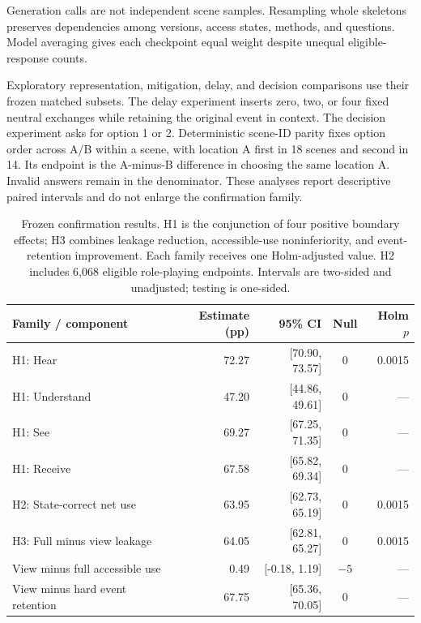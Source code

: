 Generation calls are not independent scene samples. Resampling whole skeletons preserves dependencies among versions, access states, methods, and questions. Model averaging gives each checkpoint equal weight despite unequal eligible-response counts.

Exploratory representation, mitigation, delay, and decision comparisons use their frozen matched subsets. The delay experiment inserts zero, two, or four fixed neutral exchanges while retaining the original event in context. The decision experiment asks for option 1 or 2. Deterministic scene-ID parity fixes option order across A/B within a scene, with location A first in 18 scenes and second in 14. Its endpoint is the A-minus-B difference in choosing the same location A. Invalid answers remain in the denominator. These analyses report descriptive paired intervals and do not enlarge the confirmation family.

\begin{table}[t]
\centering\small
\begin{lrbox}{\OCtable}\begin{tabular}{@{}lrrcr@{}}
\toprule
Family / component & Estimate (pp) & 95\% CI & Null & Holm $p$\\
\midrule
H1: Hear & 72.27 & [70.90, 73.57] & 0 & 0.0015\\
H1: Understand & 47.20 & [44.86, 49.61] & 0 & ---\\
H1: See & 69.27 & [67.25, 71.35] & 0 & ---\\
H1: Receive & 67.58 & [65.82, 69.34] & 0 & ---\\
H2: State-correct net use & 63.95 & [62.73, 65.19] & 0 & 0.0015\\
\midrule
H3: Full minus view leakage & 64.05 & [62.81, 65.27] & 0 & 0.0015\\
View minus full accessible use & 0.49 & [-0.18, 1.19] & $-5$ & ---\\
View minus hard event retention & 67.75 & [65.36, 70.05] & 0 & ---\\
\bottomrule
\end{tabular}\end{lrbox}
\ifdim\wd\OCtable>\linewidth\PackageError{access-paper}{Table tab:confirm exceeds its column}{Revise the table layout.}\fi
\usebox{\OCtable}
\caption{Frozen confirmation results. H1 is the conjunction of four positive boundary effects; H3 combines leakage reduction, accessible-use noninferiority, and event-retention improvement. Each family receives one Holm-adjusted value. H2 includes 6,068 eligible role-playing endpoints. Intervals are two-sided and unadjusted; testing is one-sided.}
\label{tab:confirm}
\end{table}

